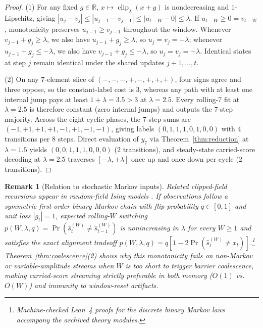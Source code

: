\documentclass[11pt]{article}
\newtheorem{remark}[theorem]{Remark}
\newcommand{\clip}{\operatorname{clip}}
\begin{document}
\begin{proof}
(1) For any fixed $g \in \mathbb{R}$, $x \mapsto \clip_\lambda(x + g)$ is nondecreasing and $1$-Lipschitz, giving $|u_j - v_j| \le |u_{j-1} - v_{j-1}| \le |u_{t-W} - 0| \le \lambda$. If $u_{t-W} \ge 0 = v_{t-W}$, monotonicity preserves $u_{j-1} \ge v_{j-1}$ throughout the window. Whenever $v_{j-1} + g_j \ge \lambda$, we also have $u_{j-1} + g_j \ge \lambda$, so $u_j = v_j = +\lambda$; whenever $u_{j-1} + g_j \le -\lambda$, we also have $v_{j-1} + g_j \le -\lambda$, so $u_j = v_j = -\lambda$. Identical states at step $j$ remain identical under the shared updates $j+1, \dots, t$.

(2) On any $7$-element slice of $(-,-,-,+,-,+,+,+)$, four signs agree and three oppose, so the constant-label cost is $3$, whereas any path with at least one internal jump pays at least $1 + \lambda = 3.5 > 3$ at $\lambda = 2.5$. Every rolling-$7$ fit at $\lambda = 2.5$ is therefore constant (zero internal jumps) and outputs the $7$-step majority. Across the eight cyclic phases, the $7$-step sums are $(-1,+1,+1,+1,-1,+1,-1,-1)$, giving labels $(0,1,1,1,0,1,0,0)$ with $4$ transitions per $8$ steps. Direct evaluation of $y_7$ via Theorem~\ref{thm:reduction} at $\lambda = 1.5$ yields $(0,0,1,1,1,0,0,0)$ ($2$ transitions), and steady-state carried-score decoding at $\lambda = 2.5$ traverses $[-\lambda, +\lambda]$ once up and once down per cycle ($2$ transitions).
\end{proof}

\begin{remark}[Relation to stochastic Markov inputs]
Related clipped-field recursions appear in random-field Ising models \cite{behn1988,ag2009}. If observations follow a symmetric first-order binary Markov chain with flip probability $q \in [0,1]$ and unit loss $|g_t| = 1$, expected rolling-$W$ switching $p(W,\lambda,q) = \Pr(\hat{s}_t^{(W)} \ne \hat{s}_{t-1}^{(W)})$ is nonincreasing in $\lambda$ for every $W \ge 1$ and satisfies the exact alignment tradeoff $p(W,\lambda,q) = q[1 - 2\Pr(\hat{s}_t^{(W)} \ne x_t)]$.\footnote{Machine-checked Lean~4 proofs for the discrete binary Markov laws accompany the archived theory modules.} Theorem~\ref{thm:coalescence}(2) shows why this monotonicity fails on non-Markov or variable-amplitude streams when $W$ is too short to trigger barrier coalescence, making carried-score streaming strictly preferable in both memory ($O(1)$ vs.\ $O(W)$) and immunity to window-reset artifacts.
\end{remark}
\end{document}
